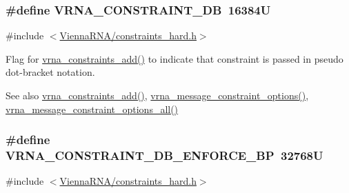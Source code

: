 \subsubsection[{V\+R\+N\+A\+\_\+\+C\+O\+N\+S\+T\+R\+A\+I\+N\+T\+\_\+\+D\+B}]{\setlength{\rightskip}{0pt plus 5cm}\#define V\+R\+N\+A\+\_\+\+C\+O\+N\+S\+T\+R\+A\+I\+N\+T\+\_\+\+D\+B~16384\+U}\label{group__hard__constraints_ga4bfc2f15c4f261c62a11af9d2aa80c90}


{\ttfamily \#include $<$\hyperlink{constraints__hard_8h}{Vienna\+R\+N\+A/constraints\+\_\+hard.\+h}$>$}



Flag for \hyperlink{group__constraints_ga35a401f680969a556858a8dd5f1d07cc}{vrna\+\_\+constraints\+\_\+add()} to indicate that constraint is passed in pseudo dot-\/bracket notation. 

\begin{DoxySeeAlso}{See also}
\hyperlink{group__constraints_ga35a401f680969a556858a8dd5f1d07cc}{vrna\+\_\+constraints\+\_\+add()}, \hyperlink{group__constraints_gaa1f20b53bf09ac2e6b0dbb13f7d89670}{vrna\+\_\+message\+\_\+constraint\+\_\+options()}, \hyperlink{group__constraints_gaec7e13fa0465c2acc7a621d1aecb709f}{vrna\+\_\+message\+\_\+constraint\+\_\+options\+\_\+all()} 
\end{DoxySeeAlso}
\hypertarget{group__hard__constraints_ga29ebe940110d60ab798fdacbcdbbfb7d}{}
\subsubsection[{V\+R\+N\+A\+\_\+\+C\+O\+N\+S\+T\+R\+A\+I\+N\+T\+\_\+\+D\+B\+\_\+\+E\+N\+F\+O\+R\+C\+E\+\_\+\+B\+P}]{\setlength{\rightskip}{0pt plus 5cm}\#define V\+R\+N\+A\+\_\+\+C\+O\+N\+S\+T\+R\+A\+I\+N\+T\+\_\+\+D\+B\+\_\+\+E\+N\+F\+O\+R\+C\+E\+\_\+\+B\+P~32768\+U}\label{group__hard__constraints_ga29ebe940110d60ab798fdacbcdbbfb7d}


{\ttfamily \#include $<$\hyperlink{constraints__hard_8h}{Vienna\+R\+N\+A/constraints\+\_\+hard.\+h}$>$}



